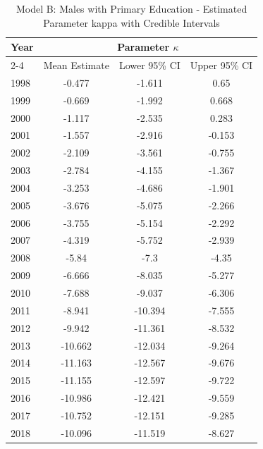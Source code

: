 \begin{landscape}
\begin{table}[htbp]
\centering
\caption{Model B: Males with Primary Education - Estimated Parameter kappa  with Credible Intervals}
\label{tab:parameters_k14}
\begin{tabular}{@{}lccc@{}}
\toprule
Year & \multicolumn{3}{c}{Parameter \(\kappa\)} \\
\cmidrule(lr){2-4}
      & Mean Estimate & Lower 95\% CI & Upper 95\% CI \\
\midrule
1998 & -0.477 & -1.611 & 0.65 \\
1999 & -0.669 & -1.992 & 0.668 \\
2000 & -1.117 & -2.535 & 0.283 \\
2001 & -1.557 & -2.916 & -0.153 \\
2002 & -2.109 & -3.561 & -0.755 \\
2003 & -2.784 & -4.155 & -1.367 \\
2004 & -3.253 & -4.686 & -1.901 \\
2005 & -3.676 & -5.075 & -2.266 \\
2006 & -3.755 & -5.154 & -2.292 \\
2007 & -4.319 & -5.752 & -2.939 \\
2008 & -5.84 & -7.3 & -4.35 \\
2009 & -6.666 & -8.035 & -5.277 \\
2010 & -7.688 & -9.037 & -6.306 \\
2011 & -8.941 & -10.394 & -7.555 \\
2012 & -9.942 & -11.361 & -8.532 \\
2013 & -10.662 & -12.034 & -9.264 \\
2014 & -11.163 & -12.567 & -9.676 \\
2015 & -11.155 & -12.597 & -9.722 \\
2016 & -10.986 & -12.421 & -9.559 \\
2017 & -10.752 & -12.151 & -9.285 \\
2018 & -10.096 & -11.519 & -8.627 \\
\bottomrule
\end{tabular}
\end{table}
\end{landscape}